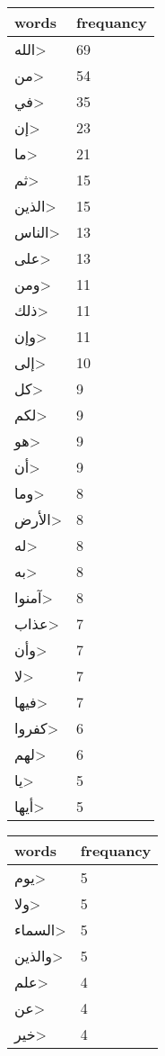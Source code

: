 \documentclass{article}
\begin{document}
\begin{multicols}{3}

\begin{center}
\begin{tabular}{ P{2cm}  P{1cm}} 
\textbf{words}    & \textbf{frequancy}  \\
\hline
\<الله> & 69 \\ 
\<من> & 54 \\ 
\<في> & 35 \\ 
\<إن> & 23 \\ 
\<ما> & 21 \\ 
\<ثم> & 15 \\ 
\<الذين> & 15 \\ 
\<الناس> & 13 \\ 
\<على> & 13 \\ 
\<ومن> & 11 \\ 
\<ذلك> & 11 \\ 
\<وإن> & 11 \\ 
\<إلى> & 10 \\ 
\<كل> & 9 \\ 
\<لكم> & 9 \\ 
\<هو> & 9 \\ 
\<أن> & 9 \\ 
\<وما> & 8 \\ 
\<الأرض> & 8 \\ 
\<له> & 8 \\ 
\<به> & 8 \\ 
\<آمنوا> & 8 \\ 
\<عذاب> & 7 \\ 
\<وأن> & 7 \\ 
\<لا> & 7 \\ 
\<فيها> & 7 \\ 
\<كفروا> & 6 \\ 
\<لهم> & 6 \\ 
\<يا> & 5 \\ 
\<أيها> & 5 \\ 
\end{tabular} 
\begin{tabular}{ P{2cm}  P{1cm}} 
\textbf{words}    & \textbf{frequancy}  \\
\hline
\<يوم> & 5 \\ 
\<ولا> & 5 \\ 
\<السماء> & 5 \\ 
\<والذين> & 5 \\ 
\<علم> & 4 \\ 
\<عن> & 4 \\ 
\<خير> & 4 \\ 

\end{tabular}
\end{center}
\end{multicols}
\end{document}

